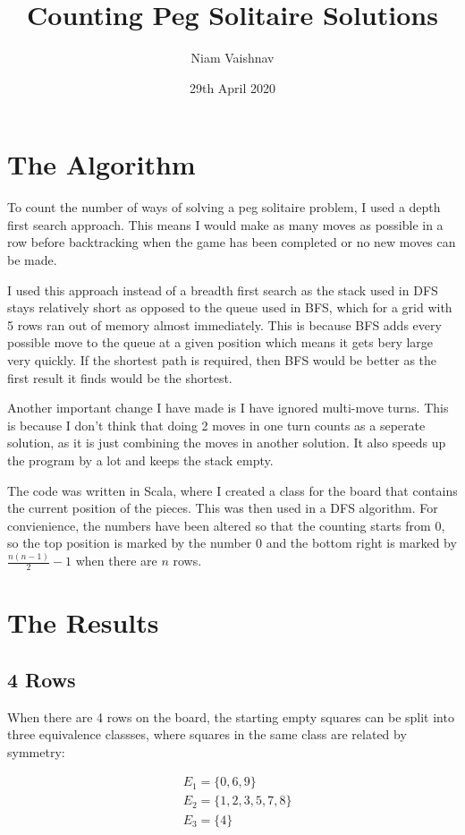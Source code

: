 \documentclass{article}
\title{Counting Peg Solitaire Solutions}
\author{Niam Vaishnav}
\date{29th April 2020}
\begin{document}
\maketitle

\section{The Algorithm}

To count the number of ways of solving a peg solitaire problem, I used a depth first search approach. This means I would make as many moves as possible in a row before backtracking when the game has been completed or no new moves can be made.

I used this approach instead of a breadth first search as the stack used in DFS stays relatively short as opposed to the queue used in BFS, which for a grid with 5 rows ran out of memory almost immediately. This is because BFS adds every possible move to the queue at a given position which means it gets bery large very quickly. If the shortest path is required, then BFS would be better as the first result it finds would be the shortest.

Another important change I have made is I have ignored multi-move turns. This is because I don't think that doing 2 moves in one turn counts as a seperate solution, as it is just combining the moves in another solution. It also speeds up the program by a lot and keeps the stack empty.

The code was written in Scala, where I created a class for the board that contains the current position of the pieces. This was then used in a DFS algorithm. For convienience, the numbers have been altered so that the counting starts from 0, so the top position is marked by the number 0 and the bottom right is marked by $\frac{n(n-1)}{2} - 1$ when there are $n$ rows.

\section{The Results}

\subsection{4 Rows}

When there are 4 rows on the board, the starting empty squares can be split into three equivalence classses, where squares in the same class are related by symmetry:

\begin{align*}
    & E_1 = \{0, 6, 9\} \\
    & E_2 = \{1, 2, 3, 5, 7, 8\} \\
    & E_3 = \{4\}
\end{align*}
\end{document}
